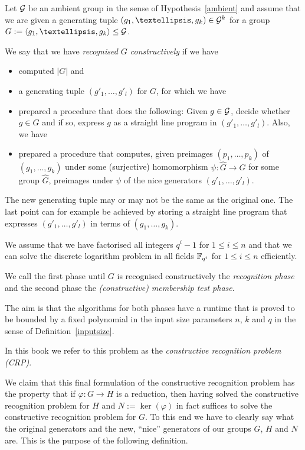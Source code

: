 \begin{Problem}
\label{ProbCR3}
Let $\mathcal{G}$ be an ambient group in the sense of Hypothesis~\ref{ambient} and 
assume that we are given a generating tuple $(g_1, \ldots, g_k) \in
\GG^k$ for a group $G := \left< g_1, \ldots, g_k \right> \le \GG$. 

We say that we have \emph{recognised $G$ constructively} if we have 
\begin{itemize}
\item computed $|G|$ and
\item a generating tuple $( g'_1, \ldots, g'_l )$ for $G$, for which we have
\item 
prepared a procedure that does the following: Given $g \in \mathcal{G}$,
decide whether $g \in G$ and if so, express $g$ as a straight line program
in $(g'_1, \ldots, g'_l)$. Also, we have
\item prepared a procedure that computes, given preimages $(p_1, \ldots,
p_k)$ of $(g_1, \ldots, g_k)$ under some (surjective) homomorphism $\psi
: \hat G \to G$ for some group $\hat G$, preimages under $\psi$ of the
nice generators $(g'_1, \ldots, g'_l)$.
\end{itemize}
The new generating tuple may or may not be the same as the original one.
The last point can for example be achieved by storing a straight line
program that expresses $(g'_1, \ldots, g'_l)$ in terms of $(g_1, \ldots,
g_k)$.

We assume that we have factorised all integers $q^i-1$ for $1 \le i \le n$
and that we can solve the discrete logarithm problem in all fields
$\mathbb{F}_{q^i}$ for $1 \le i \le n$ efficiently. 

We call the first phase until $G$ is
recognised constructively the \emph{recognition phase} and the second
phase the \emph{(constructive) membership test phase}.

The aim is that the algorithms for both phases have a runtime that is proved
to be bounded by a fixed polynomial in the input size parameters $n$, $k$
and $q$ in the sense of Definition~\ref{inputsize}.

In this book we refer to this problem as the \emph{constructive recognition
problem (CRP)}.
\proofend
\end{Problem}

We claim that this final formulation of the constructive recognition
problem has the property that if $\varphi : G \to H$ is a reduction, then
having solved the constructive recognition problem for $H$ and $N :=
\ker(\varphi)$ in fact suffices to solve the constructive recognition
problem for $G$. To this end we have to
clearly say what the original generators and the new, ``nice'' generators
of our groups $G$, $H$ and $N$ are. This is the purpose of the following
definition.

